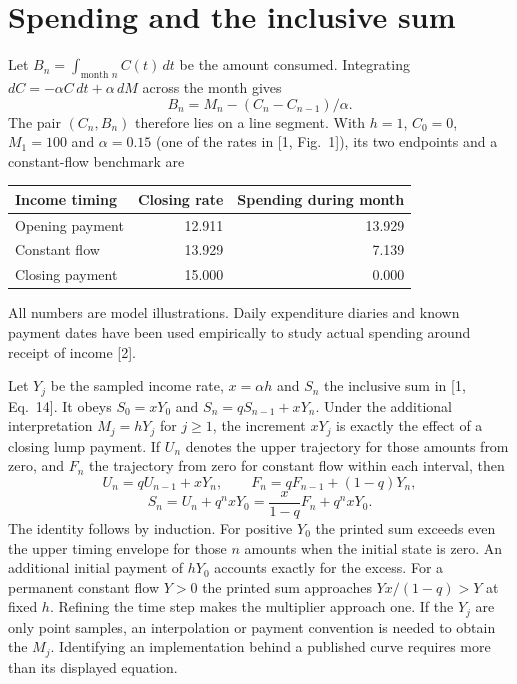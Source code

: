 \documentclass[11pt]{article}
\begin{document}
\newpage
\section{Spending and the inclusive sum}
Let $B_n=\int_{\text{month }n} C(t)\,dt$ be the amount consumed. Integrating $dC=-\alpha C\,dt+\alpha\,dM$ across the month gives
\[
 B_n=M_n-(C_n-C_{n-1})/\alpha .
\]
The pair $(C_n,B_n)$ therefore lies on a line segment. With $h=1$, $C_0=0$, $M_1=100$ and $\alpha=0.15$ (one of the rates in [1, Fig.~1]), its two endpoints and a constant-flow benchmark are
\begin{center}\begin{tabular}{lrr}\toprule
Income timing & Closing rate & Spending during month\\\midrule
Opening payment & 12.911 & 13.929\\
Constant flow & 13.929 & 7.139\\
Closing payment & 15.000 & 0.000\\\bottomrule
\end{tabular}\end{center}
All numbers are model illustrations. Daily expenditure diaries and known payment dates have been used empirically to study actual spending around receipt of income [2].

Let $Y_j$ be the sampled income rate, $x=\alpha h$ and $S_n$ the inclusive sum in [1, Eq.~14]. It obeys $S_0=xY_0$ and $S_n=qS_{n-1}+xY_n$. Under the additional interpretation $M_j=hY_j$ for $j\ge1$, the increment $xY_j$ is exactly the effect of a closing lump payment. If $U_n$ denotes the upper trajectory for those amounts from zero, and $F_n$ the trajectory from zero for constant flow within each interval, then
\[
 U_n=q U_{n-1}+xY_n,\qquad F_n=q F_{n-1}+(1-q)Y_n,
\]
\[
 S_n=U_n+q^nxY_0=\frac{x}{1-q}F_n+q^nxY_0 .
\]
The identity follows by induction. For positive $Y_0$ the printed sum exceeds even the upper timing envelope for those $n$ amounts when the initial state is zero. An additional initial payment of $hY_0$ accounts exactly for the excess. For a permanent constant flow $Y>0$ the printed sum approaches $Yx/(1-q)>Y$ at fixed $h$. Refining the time step makes the multiplier approach one. If the $Y_j$ are only point samples, an interpolation or payment convention is needed to obtain the $M_j$. Identifying an implementation behind a published curve requires more than its displayed equation.

\newpage
\end{document}

